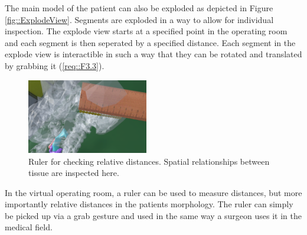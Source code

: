 The main model of the patient can also be exploded as depicted in Figure \ref{fig::ExplodeView}.
Segments are exploded in a way to allow for individual inspection.
The explode view starts at a specified point in the operating room and each segment is then seperated by a specified distance.
Each segment in the explode view is interactible in such a way that they can be rotated and translated by grabbing it (\ref{req::F3.3}).

\begin{figure}[ht]
    \centering
    \includegraphics[width=200px]{images/implementation/features/visualization/ruler.png}
    \caption{\label{fig::FeatureRuler} Ruler for checking relative distances. Spatial relationships between tissue are inspected here.}
\end{figure}

In the virtual operating room, a ruler can be used to measure distances, but more importantly relative distances in the patients morphology.
The ruler can simply be picked up via a grab gesture and used in the same way a surgeon uses it in the medical field.